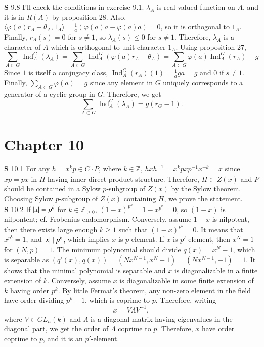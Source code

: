 \documentclass[a4paper, 12pt]{article}
\theoremstyle{Mydefinition}
\theoremstyle{Mytheorem}
\DeclareMathOperator{\Ind}{Ind}
\begin{document}
\noindent \textbf{S} 9.8
I'll check the conditions in exercise 9.1. $\lambda_A$ is real-valued function on $A$, and it is in $R(A)$ by proposition 28. Also, $\langle \varphi(a)r_A - \theta_A, 1_A\rangle = \frac{1}{a}(\varphi(a)a - \varphi(a)a) = 0$, so it is orthogonal to $1_A$. Finally, $r_A(s)=0$ for $s\neq 1$, so $\lambda_A(s)\leq 0$ for $s\neq 1$. Therefore, $\lambda_A$ is a character of $A$ which is orthogonal to unit character $1_A$. Using proposition 27,
\begin{equation}
    \sum_{A\subset G}\Ind_A^G(\lambda_A) = \sum_{A\subset G}\Ind_A^G(\varphi(a)r_A - \theta_A) = \sum_{A\subset G}\varphi(a)\Ind_A^G(r_A) - g
\end{equation}
Since $1$ is itself a conjugacy class, $\Ind_A^G(r_A)(1) = \frac{1}{a}ga = g$ and $0$ if $s\neq 1$. Finally, $\sum_{A\subset G}\varphi(a) = g$ since any element in $G$ uniquely corresponds to a generator of a cyclic group in $G$. Therefore, we get
\begin{equation}
    \sum_{A\subset G}\Ind_A^G(\lambda_A) = g(r_G-1).
\end{equation}

\newpage

\section{Chapter 10}

\noindent \textbf{S} 10.1
For any $h = x^k p\in C\cdot P$, where $k\in\mathbb{Z}$, $hxh^{-1} = x^kpxp^{-1}x^{-k} = x$ since $xp=px$ in $H$ having inner direct product structure. Therefore, $H\subset Z(x)$ and $P$ should be contained in a Sylow $p$-subgroup of $Z(x)$ by the Sylow theorem. Choosing Sylow $p$-subgroup of $Z(x)$ containing $H$, we prove the statement.\\

\noindent \textbf{S} 10.2
If $\abs{x} = p^k$ for $k\in\mathbb{Z}_{\geq 0}$, $(1-x)^{p^k} = 1-x^{p^k} = 0$, so $(1-x)$ is nilpontent; cf. Frobenius endomorphism. Conversely, assume $1-x$ is nilpotent, then there exists large enough $k\geq 1$ such that $(1-x)^{p^k} = 0$. It means that $x^{p^k} = 1$, and $\abs{x}\mid p^k$, which implies $x$ is $p$-element.
If $x$ is $p'$-element, then $x^N = 1$ for $(N, p)=1$. The minimum polynomial should divide $q(x) = x^N-1$, which is separable as $(q'(x), q(x)) = (Nx^{N-1}, x^N-1) = (Nx^{N-1}, -1) = 1$. It shows that the minimal polynomial is separable and $x$ is diagonalizable in a finite extension of $k$. Conversely, assume $x$ is diagonalizable in some finite extension of $k$ having order $p^k$. By little Fermat's theorem, any non-zero element in the field have order dividing $p^k-1$, which is coprime to $p$. Therefore, writing
\begin{equation}
    x = V\Lambda V^{-1},
\end{equation}
where $V\in GL_n(k)$ and $\Lambda$ is a diagonal matrix having eigenvalues in the diagonal part, we get the order of $\Lambda$ coprime to $p$. Therefore, $x$ have order coprime to $p$, and it is an $p'$-element.\\
\end{document}
